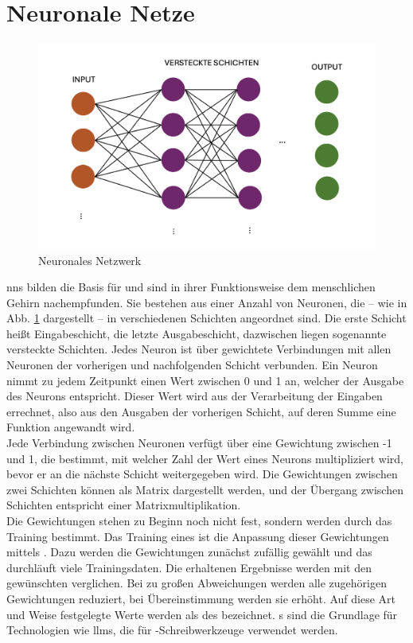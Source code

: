 \documentclass[../main.tex]{subfiles}
\begin{document}
\section{Neuronale Netze}

\begin{figure}[h!]
  \includegraphics[scale=0.6]{bilder/NeuralNetwork.png}
  \caption{Neuronales Netzwerk}
  \label{fig:NN}
\end{figure}

\glspl{nn} bilden die Basis für  und sind in ihrer Funktionsweise dem menschlichen Gehirn nachempfunden. Sie bestehen aus einer Anzahl von Neuronen, die – wie in Abb. \ref{fig:NN} dargestellt – in verschiedenen Schichten angeordnet sind. Die erste Schicht heißt Eingabeschicht, die letzte Ausgabeschicht, dazwischen liegen sogenannte versteckte Schichten. Jedes Neuron ist über gewichtete Verbindungen mit allen Neuronen der vorherigen und nachfolgenden Schicht verbunden. Ein Neuron nimmt zu jedem Zeitpunkt einen Wert zwischen 0 und 1 an, welcher der Ausgabe des Neurons entspricht. Dieser Wert wird aus der Verarbeitung der Eingaben errechnet, also aus den Ausgaben der vorherigen Schicht, auf deren Summe eine Funktion angewandt wird. \\
Jede Verbindung zwischen Neuronen verfügt über eine Gewichtung zwischen -1 und 1, die bestimmt, mit welcher Zahl der Wert eines Neurons multipliziert wird, bevor er an die nächste Schicht weitergegeben wird. Die Gewichtungen zwischen zwei Schichten können als Matrix dargestellt werden, und der Übergang zwischen Schichten entspricht einer Matrixmultiplikation. \\
Die Gewichtungen stehen zu Beginn noch nicht fest, sondern werden durch das Training bestimmt. Das Training eines  ist die Anpassung dieser Gewichtungen mittels . Dazu werden die Gewichtungen zunächst zufällig gewählt und das  durchläuft viele Trainingsdaten. Die erhaltenen Ergebnisse werden mit den gewünschten verglichen. Bei zu großen Abweichungen werden alle zugehörigen Gewichtungen reduziert, bei Übereinstimmung werden sie erhöht. Auf diese Art und Weise festgelegte Werte werden als  des  bezeichnet. s sind die Grundlage für Technologien wie \glspl{llm}, die für -Schreibwerkzeuge verwendet werden. 
\end{document}
